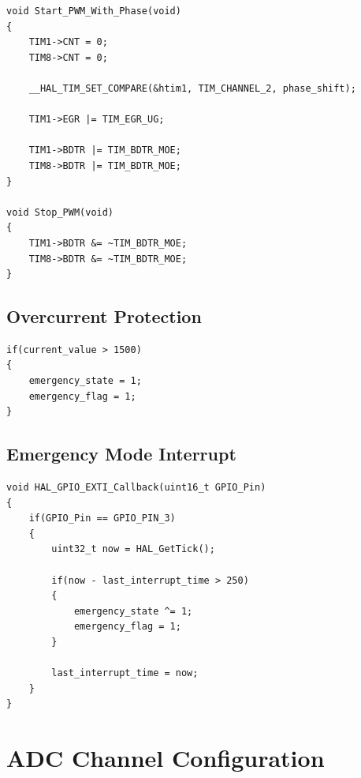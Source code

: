 \begin{lstlisting}[caption={PWM Enable/Disable Control}]
void Start_PWM_With_Phase(void)
{
    TIM1->CNT = 0;
    TIM8->CNT = 0;

    __HAL_TIM_SET_COMPARE(&htim1, TIM_CHANNEL_2, phase_shift);

    TIM1->EGR |= TIM_EGR_UG;

    TIM1->BDTR |= TIM_BDTR_MOE;
    TIM8->BDTR |= TIM_BDTR_MOE;
}

void Stop_PWM(void)
{
    TIM1->BDTR &= ~TIM_BDTR_MOE;
    TIM8->BDTR &= ~TIM_BDTR_MOE;
}
\end{lstlisting}


\subsection{Overcurrent Protection}

\begin{lstlisting}[caption={Overcurrent Protection Condition}]
if(current_value > 1500)
{
    emergency_state = 1;
    emergency_flag = 1;
}
\end{lstlisting}


\subsection{Emergency Mode Interrupt}

\begin{lstlisting}[caption={External Interrupt for Emergency Stop}]
void HAL_GPIO_EXTI_Callback(uint16_t GPIO_Pin)
{
    if(GPIO_Pin == GPIO_PIN_3)
    {
        uint32_t now = HAL_GetTick();

        if(now - last_interrupt_time > 250)
        {
            emergency_state ^= 1;
            emergency_flag = 1;
        }

        last_interrupt_time = now;
    }
}
\end{lstlisting}

\vspace{0.5cm}

\section{ADC Channel Configuration}

